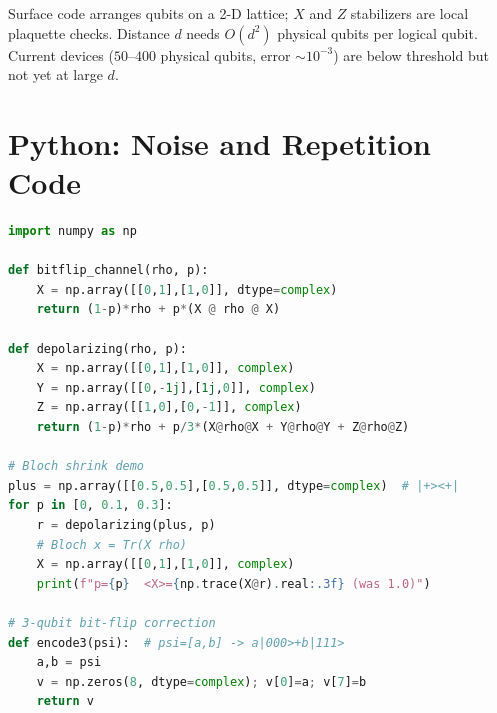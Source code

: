 Surface code arranges qubits on a 2-D lattice; $X$ and $Z$ stabilizers are local plaquette checks. Distance $d$ needs $O(d^2)$ physical qubits per logical qubit. Current devices ($50$--$400$ physical qubits, error $\sim10^{-3}$) are below threshold but not yet at large $d$.

\begin{center}
\end{center}

\section{Python: Noise and Repetition Code}

\begin{lstlisting}[language=Python]
import numpy as np

def bitflip_channel(rho, p):
    X = np.array([[0,1],[1,0]], dtype=complex)
    return (1-p)*rho + p*(X @ rho @ X)

def depolarizing(rho, p):
    X = np.array([[0,1],[1,0]], complex)
    Y = np.array([[0,-1j],[1j,0]], complex)
    Z = np.array([[1,0],[0,-1]], complex)
    return (1-p)*rho + p/3*(X@rho@X + Y@rho@Y + Z@rho@Z)

# Bloch shrink demo
plus = np.array([[0.5,0.5],[0.5,0.5]], dtype=complex)  # |+><+|
for p in [0, 0.1, 0.3]:
    r = depolarizing(plus, p)
    # Bloch x = Tr(X rho)
    X = np.array([[0,1],[1,0]], complex)
    print(f"p={p}  <X>={np.trace(X@r).real:.3f} (was 1.0)")

# 3-qubit bit-flip correction
def encode3(psi):  # psi=[a,b] -> a|000>+b|111>
    a,b = psi
    v = np.zeros(8, dtype=complex); v[0]=a; v[7]=b
    return v
\end{lstlisting}

